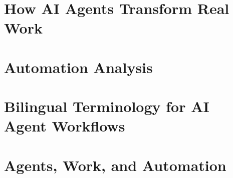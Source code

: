 \documentclass[11pt,a4paper,oneside,openany]{book}
\begin{document}
\chapter{How AI Agents Transform Real Work}


\chapter{Automation Analysis}
\label{ch:automation-analysis}




\chapter{Bilingual Terminology for AI Agent Workflows}


\chapter{Agents, Work, and Automation}


\printbibliography[heading=bibintoc,title={References}]
\end{document}
